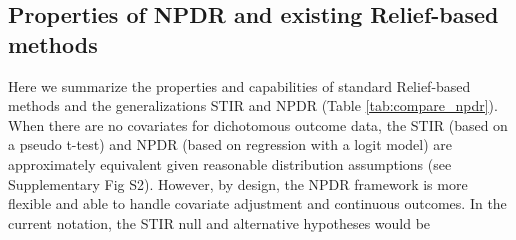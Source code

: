 \documentclass[10pt]{article}
\begin{document}
% 

\subsection{Properties of NPDR and existing Relief-based methods}
Here we summarize the properties and capabilities of standard Relief-based methods and the generalizations STIR and NPDR (Table \ref{tab:compare_npdr}).
When there are no covariates for dichotomous outcome data, the STIR (based on a pseudo t-test) and NPDR (based on regression with a logit model) are approximately equivalent given reasonable distribution assumptions (see Supplementary Fig S2).
However, by design, the NPDR framework is more flexible and able to handle covariate adjustment and continuous outcomes.
In the current notation, the STIR null and alternative hypotheses would be
\end{document}
